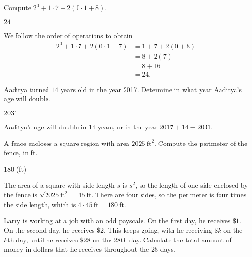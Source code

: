 \documentclass[11pt]{article}
\begin{document}
\setlength{\parindent}{0pt}

\begin{problem}
Compute $2^0 + 1 \cdot 7 + 2(0 \cdot 1 + 8)$.
\end{problem}

\begin{answer}
$\boxed{24}$
\end{answer}

\begin{solution}
We follow the order of operations to obtain
\begin{align*}
2^0 + 1 \cdot 7 + 2(0 \cdot 1 + 7) &= 1 + 7 + 2(0 + 8) \\
&= 8 + 2(7) \\ 
&= 8 + 16 \\
&= \boxed{24}.
\end{align*}
\end{solution}


\begin{problem}
Aaditya turned $14$ years old in the year 2017. Determine in what year Aaditya's age will double.
\end{problem}

\begin{answer}
$\boxed{2031}$
\end{answer}

\begin{solution}
Aaditya's age will double in $14$ years, or in the year $2017 + 14 = \boxed{2031}$.
\end{solution}


\begin{problem}
A fence encloses a square region with area $2025\ \text{ft}^2$. Compute the perimeter of the fence, in ft.
\end{problem}

\begin{answer}
$\boxed{180}$ (ft)
\end{answer}

\begin{solution}
The area of a square with side length $s$ is $s^2$, so the length of one side enclosed by the fence is
$\sqrt{2025\ \text{ft}^2} = 45\ \text{ft}$. There are four sides, so the perimeter is four times the side
length, which is $4 \cdot 45\ \text{ft} = \boxed{180}\ \text{ft}$.
\end{solution}


\begin{problem}
Larry is working at a job with an odd payscale. On the first day, he receives $\$1$.
On the second day, he receives $\$2$. This keeps going, with he receiving $\$k$ on
the $k$th day, until he receives $\$28$ on the $28$th day. Calculate the total amount
of money in dollars that he receives throughout the 28 days.
\end{problem}
\end{document}
